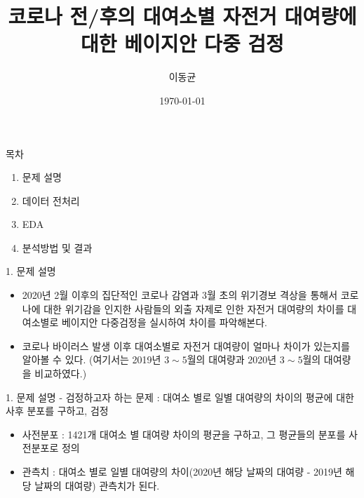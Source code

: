\documentclass[mathserif]{beamer}
\title{코로나 전/후의 대여소별 자전거 대여량에 대한 베이지안 다중 검정}
\author{이동균}
\date{\today}
\begin{document}
\begin{frame}
    \titlepage
\end{frame}

\begin{frame}{목차}
\begin{enumerate}
    \item 문제 설명
    \item 데이터 전처리
    \item EDA
    \item 분석방법 및 결과
\end{enumerate}
\end{frame}

\begin{frame}{1. 문제 설명}
\begin{itemize}
    \item 2020년 2월 이후의 집단적인 코로나 감염과 3월 초의 위기경보 격상을 통해서 코로나에 대한 위기감을 인지한 사람들의 외출 자제로 인한 자전거 대여량의 차이를 대여소별로 베이지안 다중검정을 실시하여 차이를 파악해본다.
    \vspace{3mm}
    \item 코로나 바이러스 발생 이후 대여소별로 자전거 대여량이 얼마나 차이가 있는지를 알아볼 수 있다. (여기서는 2019년 $3\sim5$월의 대여량과 2020년 $3\sim5$월의 대여량을 비교하였다.)
\end{itemize}
\end{frame}

\begin{frame}{1. 문제 설명}
- 검정하고자 하는 문제 : 대여소 별로 일별 대여량의 차이의 평균에 대한 사후 분포를 구하고, 검정   
\begin{itemize}
    \item 사전분포 : 1421개 대여소 별 대여량 차이의 평균을 구하고, 그 평균들의 분포를 사전분포로 정의
    \item 관측치 : 대여소 별로 일별 대여량의 차이(2020년 해당 날짜의 대여량 - 2019년 해당 날짜의 대여량) 관측치가 된다.
\end{itemize}
\end{frame}
\end{document}
